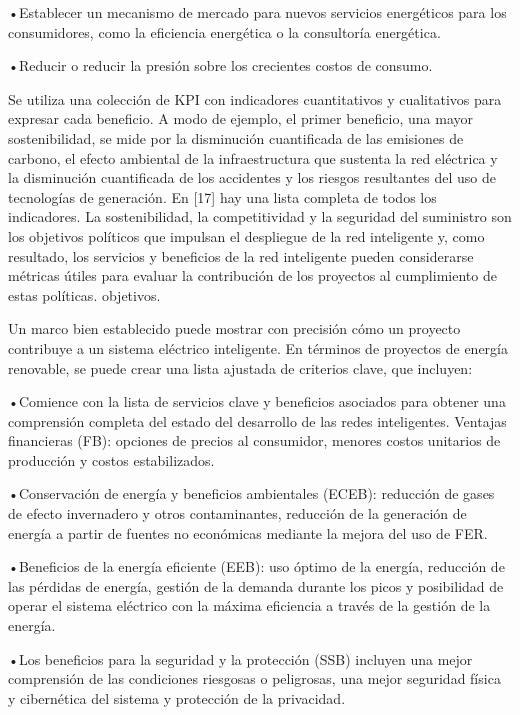 \documentclass[
]{article}
\begin{document}
•Establecer un mecanismo de mercado para nuevos servicios energéticos
para los consumidores, como la eficiencia energética o la consultoría
energética.

•Reducir o reducir la presión sobre los crecientes costos de consumo.

Se utiliza una colección de KPI con indicadores cuantitativos y
cualitativos para expresar cada beneficio. A modo de ejemplo, el primer
beneficio, una mayor sostenibilidad, se mide por la disminución
cuantificada de las emisiones de carbono, el efecto ambiental de la
infraestructura que sustenta la red eléctrica y la disminución
cuantificada de los accidentes y los riesgos resultantes del uso de
tecnologías de generación. En {[}17{]} hay una lista completa de todos
los indicadores. La sostenibilidad, la competitividad y la seguridad del
suministro son los objetivos políticos que impulsan el despliegue de la
red inteligente y, como resultado, los servicios y beneficios de la red
inteligente pueden considerarse métricas útiles para evaluar la
contribución de los proyectos al cumplimiento de estas políticas.
objetivos.

Un marco bien establecido puede mostrar con precisión cómo un proyecto
contribuye a un sistema eléctrico inteligente. En términos de proyectos
de energía renovable, se puede crear una lista ajustada de criterios
clave, que incluyen:

•Comience con la lista de servicios clave y beneficios asociados para
obtener una comprensión completa del estado del desarrollo de las redes
inteligentes. Ventajas financieras (FB): opciones de precios al
consumidor, menores costos unitarios de producción y costos
estabilizados.

•Conservación de energía y beneficios ambientales (ECEB): reducción de
gases de efecto invernadero y otros contaminantes, reducción de la
generación de energía a partir de fuentes no económicas mediante la
mejora del uso de FER.

•Beneficios de la energía eficiente (EEB): uso óptimo de la energía,
reducción de las pérdidas de energía, gestión de la demanda durante los
picos y posibilidad de operar el sistema eléctrico con la máxima
eficiencia a través de la gestión de la energía.

•Los beneficios para la seguridad y la protección (SSB) incluyen una
mejor comprensión de las condiciones riesgosas o peligrosas, una mejor
seguridad física y cibernética del sistema y protección de la
privacidad.
\end{document}
